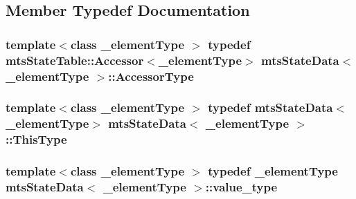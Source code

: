 \subsection{Member Typedef Documentation}
\hypertarget{classmts_state_data_a21eb9a3d0093820221159ffd63fa9616}{
\subsubsection[{Accessor\-Type}]{\setlength{\rightskip}{0pt plus 5cm}template$<$class \-\_\-element\-Type $>$ typedef {\bf mts\-State\-Table\-::\-Accessor}$<$\-\_\-element\-Type$>$ {\bf mts\-State\-Data}$<$ \-\_\-element\-Type $>$\-::{\bf Accessor\-Type}\hspace{0.3cm}{\ttfamily [protected]}}}\label{classmts_state_data_a21eb9a3d0093820221159ffd63fa9616}
\hypertarget{classmts_state_data_aaa07d52871cdcbe7388b69bbcf1b114a}{
\subsubsection[{This\-Type}]{\setlength{\rightskip}{0pt plus 5cm}template$<$class \-\_\-element\-Type $>$ typedef {\bf mts\-State\-Data}$<$\-\_\-element\-Type$>$ {\bf mts\-State\-Data}$<$ \-\_\-element\-Type $>$\-::{\bf This\-Type}\hspace{0.3cm}{\ttfamily [protected]}}}\label{classmts_state_data_aaa07d52871cdcbe7388b69bbcf1b114a}
\hypertarget{classmts_state_data_aeffdf781c6be5cac19466d4f3d25b3a3}{
\subsubsection[{value\-\_\-type}]{\setlength{\rightskip}{0pt plus 5cm}template$<$class \-\_\-element\-Type $>$ typedef \-\_\-element\-Type {\bf mts\-State\-Data}$<$ \-\_\-element\-Type $>$\-::{\bf value\-\_\-type}\hspace{0.3cm}{\ttfamily [protected]}}}\label{classmts_state_data_aeffdf781c6be5cac19466d4f3d25b3a3}


